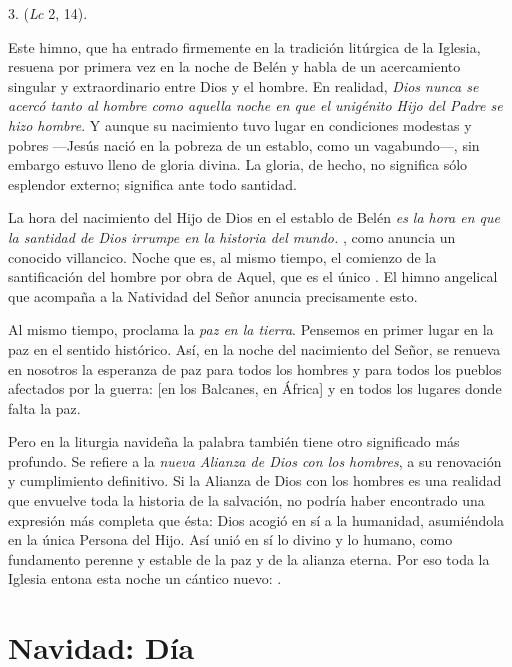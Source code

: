 \begin{body}
\begin{body}
		3.  (\emph{Lc} 2, 14).

		Este himno, que ha entrado firmemente en la tradición litúrgica de la Iglesia, resuena por primera vez en la noche de Belén y habla de un acercamiento singular y extraordinario entre Dios y el hombre. En realidad, \emph{Dios nunca se acercó tanto al hombre como aquella noche en que el unigénito Hijo del Padre se hizo hombre}. Y aunque su nacimiento tuvo lugar en condiciones modestas y pobres ---Jesús nació en la pobreza de un establo, como un vagabundo---, sin embargo estuvo lleno de gloria divina. La gloria, de hecho, no significa sólo esplendor externo; significa ante todo santidad.

		La hora del nacimiento del Hijo de Dios en el establo de Belén \emph{es la hora en que la santidad de Dios irrumpe en la historia del mundo.} , como anuncia un conocido villancico. Noche que es, al mismo tiempo, el comienzo de la santificación del hombre por obra de Aquel, que es el único . El himno angelical que acompaña a la Natividad del Señor anuncia precisamente esto.

		Al mismo tiempo, proclama la \emph{paz en la tierra}. Pensemos en primer lugar en la paz en el sentido histórico. Así, en la noche del nacimiento del Señor, se renueva en nosotros la esperanza de paz para todos los hombres y para todos los pueblos afectados por la guerra: {[}en los Balcanes, en África{]} y en todos los lugares donde falta la paz.

		Pero en la liturgia navideña la palabra  también tiene otro significado más profundo. Se refiere a la \emph{nueva Alianza de Dios con los hombres}, a su renovación y cumplimiento definitivo. Si la Alianza de Dios con los hombres es una realidad que envuelve toda la historia de la salvación, no podría haber encontrado una expresión más completa que ésta: Dios acogió en sí a la humanidad, asumiéndola en la única Persona del Hijo. Así unió en sí lo divino y lo humano, como fundamento perenne y estable de la paz y de la alianza eterna. Por eso toda la Iglesia entona esta noche un cántico nuevo: .
	\end{body}

	\chapter{Navidad: Día}


\end{body}
